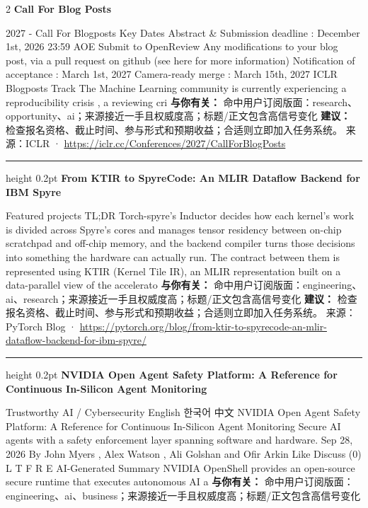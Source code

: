 \documentclass[10.5pt]{ctexart}
\begin{document}
\begin{multicols}{2}
{\large\bfseries Call For Blog Posts}\par
2027 - Call For Blogposts Key Dates Abstract \& Submission deadline : December 1st, 2026 23:59 AOE Submit to OpenReview Any modifications to your blog post, via a pull request on github (see here for more information) Notification of acceptance : March 1st, 2027 Camera-ready merge : March 15th, 2027 ICLR Blogposts Track The Machine Learning community is currently experiencing a reproducibility crisis , a reviewing cri
\textbf{与你有关：} 命中用户订阅版面：research、opportunity、ai；来源接近一手且权威度高；标题/正文包含高信号变化
\textbf{建议：} 检查报名资格、截止时间、参与形式和预期收益；合适则立即加入任务系统。
{\footnotesize\color{ormuted} 来源：ICLR · \url{https://iclr.cc/Conferences/2027/CallForBlogPosts}}
\vspace{2mm}
\hrule height 0.2pt
\vspace{2mm}
{\large\bfseries From KTIR to SpyreCode: An MLIR Dataflow Backend for IBM Spyre}\par
Featured projects TL;DR Torch-spyre’s Inductor decides how each kernel’s work is divided across Spyre’s cores and manages tensor residency between on-chip scratchpad and off-chip memory, and the backend compiler turns those decisions into something the hardware can actually run. The contract between them is represented using KTIR (Kernel Tile IR), an MLIR representation built on a data-parallel view of the accelerato
\textbf{与你有关：} 命中用户订阅版面：engineering、ai、research；来源接近一手且权威度高；标题/正文包含高信号变化
\textbf{建议：} 检查报名资格、截止时间、参与形式和预期收益；合适则立即加入任务系统。
{\footnotesize\color{ormuted} 来源：PyTorch Blog · \url{https://pytorch.org/blog/from-ktir-to-spyrecode-an-mlir-dataflow-backend-for-ibm-spyre/}}
\vspace{2mm}
\hrule height 0.2pt
\vspace{2mm}
{\large\bfseries NVIDIA Open Agent Safety Platform: A Reference for Continuous In-Silicon Agent Monitoring}\par
Trustworthy AI / Cybersecurity English 한국어 中文 NVIDIA Open Agent Safety Platform: A Reference for Continuous In-Silicon Agent Monitoring Secure AI agents with a safety enforcement layer spanning software and hardware. Sep 28, 2026 By John Myers , Alex Watson , Ali Golshan and Ofir Arkin Like Discuss (0) L T F R E AI-Generated Summary NVIDIA OpenShell provides an open-source secure runtime that executes autonomous AI a
\textbf{与你有关：} 命中用户订阅版面：engineering、ai、business；来源接近一手且权威度高；标题/正文包含高信号变化

\end{multicols}
\end{document}
